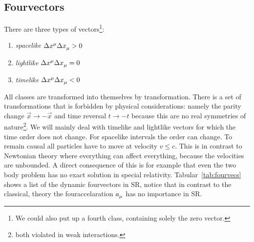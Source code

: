 \subsection{Fourvectors}
There are three types of vectors\footnote{We could also put up a fourth class,
containing solely the zero vector.}:
\begin{enumerate}
    \item \emph{spacelike} $\Delta\tensor{x}{^\mu}\Delta\tensor{x}{_\mu}>0$
    \item \emph{lightlike} $\Delta\tensor{x}{^\mu}\Delta\tensor{x}{_\mu}=0$
    \item \emph{timelike} $\Delta\tensor{x}{^\mu}\Delta\tensor{x}{_\mu}<0$
\end{enumerate}
All classes are transformed into themselves by  transformation.
There is a set of transformations that is forbidden by physical considerations: namely the
parity change $\vec{x}\to -\vec{x}$ and time reversal $t\to -t$ because this are
no real symmetries of nature\footnote{both violated in weak interactions.}.
We will mainly deal with timelike and lightlike vectors for which the time order
does not change. For spacelike intervals the order can change. To remain causal
all particles have to move at velocity $v\leq c$. This is in contrast to
Newtonian theory where everything can affect everything, because the velocities
are unbounded. A direct consequence of this is for example that even the two
body problem has no exact solution in special relativity.
Tabular~\ref{tab:fourvecs} shows a list of the dynamic fourvectors in SR,
notice that in contrast to the classical, theory the fouraccelaration
$\tensor{a}{_\mu}$ has no importance in SR.
